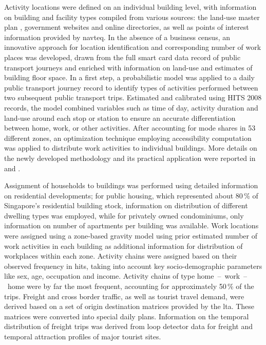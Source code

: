 Activity locations were defined on an individual building level, with  information on building and facility types compiled from various sources: \ie the land-use master plan \citep[][]{URA_Rep_URA_2008}, government websites and online directories, as well as points of interest information provided by \gls{navteq}. In the absence of a business census, an innovative approach for location identification and corresponding number of work places was developed, drawn from the full smart card data record of public transport journeys and enriched with information on land-use and estimates of building floor space. In a first step, a probabilistic model was applied to a daily public transport journey record to identify types of activities performed between two subsequent public transport trips. Estimated and calibrated using HITS 2008 records, the model combined variables such as time of day, activity duration and land-use around each stop or station to ensure an accurate differentiation between home, work, or other activities. After accounting for mode shares in 53\,different zones, an optimization technique employing accessibility computation was applied to distribute work activities to individual buildings. More details on the newly developed methodology and its practical application were reported in \citet[][]{ChakirovErath_IATBR_2012} and \citet[][]{OrdonezErath_TRR_2013}. 

Assignment of households to buildings was performed using detailed information on residential developments; for public housing, which represented about 80\,\% of Singapore's residential building stock, information on distribution of different dwelling types was employed, while for privately owned condominiums, only information on number of apartments per building was available. Work locations were assigned using a zone-based gravity model using prior estimated number of work activities in each building as additional information for distribution of workplaces within each zone. Activity chains were assigned based on their observed frequency in \gls{hits}, taking into account key socio-demographic parameters like sex, age, occupation and income. Activity chains of type home~--~work~--~home were by far the most frequent, accounting for approximately 50\,\% of the trips.
Freight and cross border traffic, as well as tourist travel demand, were derived based on a set of origin destination matrices provided by the \gls{lta}. These matrices were converted into special daily plans. Information on the temporal distribution of freight trips was derived from loop detector data for freight and temporal attraction profiles of major tourist sites.

